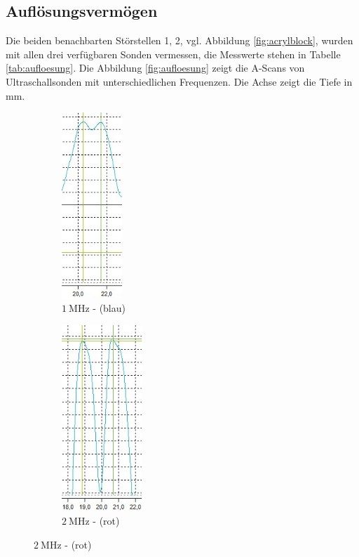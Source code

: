 \subsection{Auflösungsvermögen}
\label{sec:aufloesea}

Die beiden benachbarten Störstellen 1, 2, vgl. Abbildung \ref{fig:acrylblock},
wurden mit allen drei verfügbaren Sonden vermessen,
die Messwerte stehen in Tabelle \ref{tab:aufloesung}.
Die Abbildung \ref{fig:aufloesung} zeigt die A-Scans von Ultraschallsonden
mit unterschiedlichen Frequenzen. Die Achse zeigt die Tiefe in $\si{\milli\meter}$.

\begin{figure}
    \centering
    \begin{subfigure}{0.2\textwidth}
        \centering
        \includegraphics[height=7cm]{content/bilder/a-scan-blau.jpg}
        \caption{$\SI{1}{\mega\hertz}$ - (blau)}
        \label{fig:1mhz}
    \end{subfigure}
    \begin{subfigure}{0.2\textwidth}
        \centering
        \includegraphics[height=7cm]{content/bilder/a-scan-rot.jpg}
        \caption{$\SI{2}{\mega\hertz}$ - (rot)}
        \label{fig:2mhz}
    \end{subfigure}

\end{figure}
